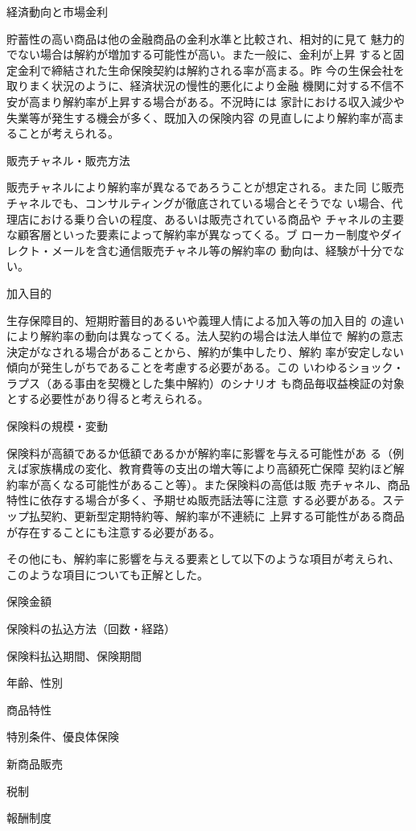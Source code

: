 \documentclass[report,gutter=10mm,fore-edge=10mm,uplatex,dvipdfmx]{jlreq}
\begin{document}
経済動向と市場金利

貯蓄性の高い商品は他の金融商品の金利水準と比較され、相対的に見て
魅力的でない場合は解約が増加する可能性が高い。また一般に、金利が上昇
すると固定金利で締結された生命保険契約は解約される率が高まる。昨
今の生保会社を取りまく状況のように、経済状況の慢性的悪化により金融
機関に対する不信不安が高まり解約率が上昇する場合がある。不況時には
家計における収入減少や失業等が発生する機会が多く、既加入の保険内容
の見直しにより解約率が高まることが考えられる。

販売チャネル・販売方法

販売チャネルにより解約率が異なるであろうことが想定される。また同
じ販売チャネルでも、コンサルティングが徹底されている場合とそうでな
い場合、代理店における乗り合いの程度、あるいは販売されている商品や
チャネルの主要な顧客層といった要素によって解約率が異なってくる。ブ
ローカー制度やダイレクト・メールを含む通信販売チャネル等の解約率の
動向は、経験が十分でない。


加入目的

生存保障目的、短期貯蓄目的あるいや義理人情による加入等の加入目的
の違いにより解約率の動向は異なってくる。法人契約の場合は法人単位で
解約の意志決定がなされる場合があることから、解約が集中したり、解約
率が安定しない傾向が発生しがちであることを考慮する必要がある。この
いわゆるショック・ラプス（ある事由を契機とした集中解約）のシナリオ
も商品毎収益検証の対象とする必要性があり得ると考えられる。

保険料の規模・変動

保険料が高額であるか低額であるかが解約率に影響を与える可能性があ
る（例えば家族構成の変化、教育費等の支出の増大等により高額死亡保障
契約ほど解約率が高くなる可能性があること等）。また保険料の高低は販
売チャネル、商品特性に依存する場合が多く、予期せぬ販売話法等に注意
する必要がある。ステップ払契約、更新型定期特約等、解約率が不連続に
上昇する可能性がある商品が存在することにも注意する必要がある。

その他にも、解約率に影響を与える要素として以下のような項目が考えられ、
このような項目についても正解とした。

保険金額


保険料の払込方法（回数・経路）

保険料払込期間、保険期間

年齢、性別

商品特性

特別条件、優良体保険

新商品販売

税制

報酬制度
\end{document}
